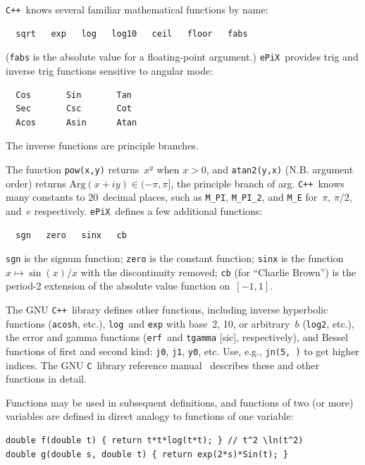 \documentclass[12pt,letterpaper]{book}
\newcommand{\code}[1]{\texttt{#1}}
\newcommand{\ePiX}{\code{ePiX}}
\newcommand{\C}{\code{C}}
\newcommand{\CXX}{\code{C++}}
\newcommand{\texicomment}{}
\newcommand{\texicommentend}{}
\newcommand{\teximath}[1]{$#1$}
\newcommand{\findex}[1]{\ignorespaces}
\begin{document}
\CXX~knows several familiar mathematical functions by name:
\begin{verbatim}
  sqrt   exp   log   log10   ceil   floor   fabs
\end{verbatim}
(\code{fabs} is the absolute value for a floating-point argument.)
\ePiX\ provides trig and inverse trig functions sensitive to angular
mode:
\findex{Cos}
\findex{Sin}
\findex{Tan}
\findex{Sec}
\findex{Csc}
\findex{Cot}
\findex{Acos}
\findex{Asin}
\findex{Atan}
\begin{verbatim}
  Cos       Sin       Tan
  Sec       Csc       Cot
  Acos      Asin      Atan
\end{verbatim}
The inverse functions are principle branches.

The function \code{pow(x,y)} returns~\teximath{x^y} when
\teximath{x>0}, and \code{atan2(y,x)} (N.B. argument order) returns
\teximath{\mathrm{Arg}(x+iy)\in(-\pi,\pi]}, the principle branch of
arg.  \CXX~knows many constants to 20~decimal places, such as
\code{M\_PI}, \code{M\_PI\_2}, and \code{M\_E} for~\teximath{\pi},
\teximath{\pi/2}, and~\teximath{e} respectively.  \ePiX\ defines a few
additional functions:
\findex{sgn}
\findex{zero}
\findex{sinx}
\findex{cb}
\begin{verbatim}
  sgn   zero   sinx   cb
\end{verbatim}
\texicomment
\begin{center}
  \qquad
  \qquad
  
\end{center}
\medskip
\texicommentend
\code{sgn} is the signum function; \code{zero} is the constant
function; \code{sinx} is the function \teximath{x\mapsto \sin(x)/x}
with the discontinuity removed; \code{cb} (for ``Charlie Brown'') is
the period-2 extension of the absolute value function
on~\teximath{[-1,1]}.

The GNU \CXX\ library defines other functions, including inverse
hyperbolic functions (\code{acosh}, etc.), \code{log}~and \code{exp}
with base~2, 10, or arbitrary~\teximath{b} (\code{log2}, etc.), the
error and gamma functions (\code{erf}~and \code{tgamma} [sic],
respectively), and Bessel functions of first and second kind:
\code{j0}, \code{j1}, \code{y0}, etc. Use, e.g., \code{jn(5,~)} to get
higher indices.  The GNU \C~library reference manual~\cite{GNUC}
describes these and other functions in detail.

Functions may be used in subsequent definitions, and functions of two
(or more) variables are defined in direct analogy to functions of one
variable:
\begin{verbatim}
double f(double t) { return t*t*log(t*t); } // t^2 \ln(t^2)
double g(double s, double t) { return exp(2*s)*Sin(t); }
\end{verbatim}
\end{document}
